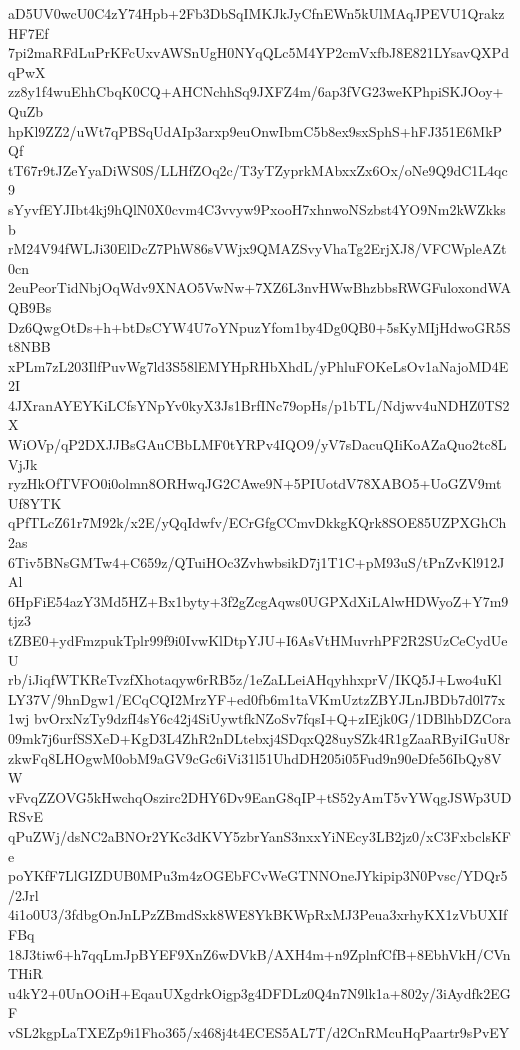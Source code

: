 aD5UV0wcU0C4zY74Hpb+2Fb3DbSqIMKJkJyCfnEWn5kUlMAqJPEVU1QrakzHF7Ef
7pi2maRFdLuPrKFcUxvAWSnUgH0NYqQLc5M4YP2cmVxfbJ8E821LYsavQXPdqPwX
zz8y1f4wuEhhCbqK0CQ+AHCNchhSq9JXFZ4m/6ap3fVG23weKPhpiSKJOoy+QuZb
hpKl9ZZ2/uWt7qPBSqUdAIp3arxp9euOnwIbmC5b8ex9sxSphS+hFJ351E6MkPQf
tT67r9tJZeYyaDiWS0S/LLHfZOq2c/T3yTZyprkMAbxxZx6Ox/oNe9Q9dC1L4qc9
sYyvfEYJIbt4kj9hQlN0X0cvm4C3vvyw9PxooH7xhnwoNSzbst4YO9Nm2kWZkksb
rM24V94fWLJi30ElDcZ7PhW86sVWjx9QMAZSvyVhaTg2ErjXJ8/VFCWpleAZt0cn
2euPeorTidNbjOqWdv9XNAO5VwNw+7XZ6L3nvHWwBhzbbsRWGFuloxondWAQB9Bs
Dz6QwgOtDs+h+btDsCYW4U7oYNpuzYfom1by4Dg0QB0+5sKyMIjHdwoGR5St8NBB
xPLm7zL203IlfPuvWg7ld3S58lEMYHpRHbXhdL/yPhluFOKeLsOv1aNajoMD4E2I
4JXranAYEYKiLCfsYNpYv0kyX3Js1BrfINc79opHs/p1bTL/Ndjwv4uNDHZ0TS2X
WiOVp/qP2DXJJBsGAuCBbLMF0tYRPv4IQO9/yV7sDacuQIiKoAZaQuo2tc8LVjJk
ryzHkOfTVFO0i0olmn8ORHwqJG2CAwe9N+5PIUotdV78XABO5+UoGZV9mtUf8YTK
qPfTLcZ61r7M92k/x2E/yQqIdwfv/ECrGfgCCmvDkkgKQrk8SOE85UZPXGhCh2as
6Tiv5BNsGMTw4+C659z/QTuiHOc3ZvhwbsikD7j1T1C+pM93uS/tPnZvKl912JAl
6HpFiE54azY3Md5HZ+Bx1byty+3f2gZcgAqws0UGPXdXiLAlwHDWyoZ+Y7m9tjz3
tZBE0+ydFmzpukTplr99f9i0IvwKlDtpYJU+I6AsVtHMuvrhPF2R2SUzCeCydUeU
rb/iJiqfWTKReTvzfXhotaqyw6rRB5z/1eZaLLeiAHqyhhxprV/IKQ5J+Lwo4uKl
LY37V/9hnDgw1/ECqCQI2MrzYF+ed0fb6m1taVKmUztzZBYJLnJBDb7d0l77x1wj
bvOrxNzTy9dzfI4sY6c42j4SiUywtfkNZoSv7fqsI+Q+zIEjk0G/1DBlhbDZCora
09mk7j6urfSSXeD+KgD3L4ZhR2nDLtebxj4SDqxQ28uySZk4R1gZaaRByiIGuU8r
zkwFq8LHOgwM0obM9aGV9cGc6iVi31l51UhdDH205i05Fud9n90eDfe56IbQy8VW
vFvqZZOVG5kHwchqOszirc2DHY6Dv9EanG8qIP+tS52yAmT5vYWqgJSWp3UDRSvE
qPuZWj/dsNC2aBNOr2YKc3dKVY5zbrYanS3nxxYiNEcy3LB2jz0/xC3FxbclsKFe
poYKfF7LlGIZDUB0MPu3m4zOGEbFCvWeGTNNOneJYkipip3N0Pvsc/YDQr5/2Jrl
4i1o0U3/3fdbgOnJnLPzZBmdSxk8WE8YkBKWpRxMJ3Peua3xrhyKX1zVbUXIfFBq
18J3tiw6+h7qqLmJpBYEF9XnZ6wDVkB/AXH4m+n9ZplnfCfB+8EbhVkH/CVnTHiR
u4kY2+0UnOOiH+EqauUXgdrkOigp3g4DFDLz0Q4n7N9lk1a+802y/3iAydfk2EGF
vSL2kgpLaTXEZp9i1Fho365/x468j4t4ECES5AL7T/d2CnRMcuHqPaartr9sPvEY
